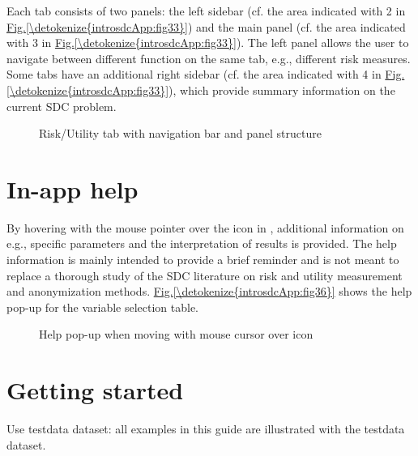 \documentclass[letterpaper,10pt,english]{sphinxmanual}
\begin{document}
Each tab consists of two panels: the left sidebar (cf. the area indicated with 2 in \hyperref[\detokenize{introsdcApp:fig33}]{Fig.\@ \ref{\detokenize{introsdcApp:fig33}}})
and the main panel (cf. the area indicated with 3 in \hyperref[\detokenize{introsdcApp:fig33}]{Fig.\@ \ref{\detokenize{introsdcApp:fig33}}}). The left panel
allows the user to navigate between different function on the same tab, e.g., different
risk measures. Some tabs have an additional right sidebar (cf. the area indicated with 4 in \hyperref[\detokenize{introsdcApp:fig33}]{Fig.\@ \ref{\detokenize{introsdcApp:fig33}}}),
which provide summary information on the current SDC problem.

\begin{figure}[htbp]
\centering
\capstart

\noindent{}
\caption{Risk/Utility tab with navigation bar and panel structure}\label{\detokenize{introsdcApp:fig33}}\label{\detokenize{introsdcApp:id3}}\end{figure}


\section{In-app help}
\label{\detokenize{introsdcApp:in-app-help}}
By hovering with the mouse pointer over the  icon in , additional information on
e.g., specific parameters and the interpretation of results is provided. The help information
is mainly intended to provide a brief reminder and is not meant to replace a thorough
study of the SDC literature on risk and utility measurement and anonymization methods.
\hyperref[\detokenize{introsdcApp:fig36}]{Fig.\@ \ref{\detokenize{introsdcApp:fig36}}} shows the help pop-up for the variable selection table.

\begin{figure}[htbp]
\centering
\capstart

\noindent{}
\caption{Help pop-up when moving with mouse cursor over  icon}\label{\detokenize{introsdcApp:fig36}}\label{\detokenize{introsdcApp:id4}}\end{figure}


\section{Getting started}
\label{\detokenize{introsdcApp:getting-started}}
Use testdata dataset: all examples in this guide are illustrated with the testdata dataset.
\end{document}
